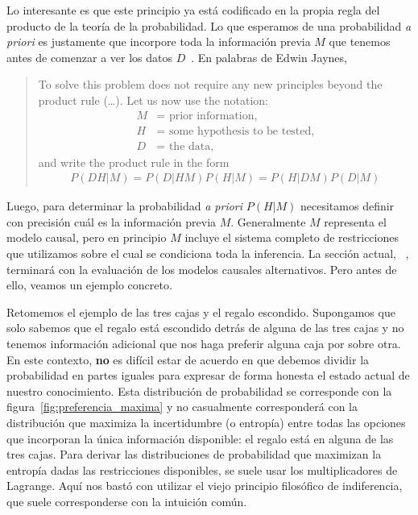 \documentclass[a4paper,11pt]{book}
\theoremstyle{definition}
\begin{document}
%
Lo interesante es que este principio ya est\'a codificado en la propia regla del producto de la teor\'ia de la probabilidad.
%
Lo que esperamos de una probabilidad \emph{a priori} es justamente que incorpore toda la informaci\'on previa $M$ que tenemos antes de comenzar a ver los datos $D$~\cite{Jaynes2003}.
%
En palabras de Edwin Jaynes,
%
\begin{quotation}
To solve this problem does not require any new principles beyond the product rule (\dots). Let us now use the notation:
\begin{align*}
M &= \text{ prior information,} \\
H &= \text{ some hypothesis to be tested,} \\
D &= \text{ the data,}
\end{align*}
and write the product rule in the form
\begin{align}
P(DH|M) = P(D|HM)P(H|M) = P(H|DM)P(D|M)
\end{align}
\end{quotation}
%
Luego, para determinar la probabilidad \emph{a priori} $P(H|M)$ necesitamos definir con precisi\'on cu\'al es la informaci\'on previa $M$.
%
Generalmente $M$ representa el modelo causal, pero en principio $M$ incluye el sistema completo de restricciones que utilizamos sobre el cual se condiciona toda la inferencia.
%
La secci\'on actual,~ \emph{}, terminar\'a con la evaluaci\'on de los modelos causales alternativos.
%
Pero antes de ello, veamos un ejemplo concreto.


Retomemos el ejemplo de las tres cajas y el regalo escondido.
Supongamos que solo sabemos que el regalo est\'a escondido detr\'as de alguna de las tres cajas y no tenemos informaci\'on adicional que nos haga preferir alguna caja por sobre otra.
%
En este contexto, \textbf{no} es dif\'icil estar de acuerdo en que debemos dividir la probabilidad en partes iguales para expresar de forma honesta el estado actual de nuestro conocimiento.
%
Esta distribuci\'on de probabilidad se corresponde con la figura~\ref{fig:preferencia_maxima} y no casualmente corresponder\'a con la distribuci\'on que maximiza la incertidumbre (o entrop\'ia) entre todas las opciones que incorporan la \'unica informaci\'on disponible: el regalo est\'a en alguna de las tres cajas.
%
Para derivar las distribuciones de probabilidad que maximizan la entrop\'ia dadas las restricciones disponibles, se suele usar los multiplicadores de Lagrange.
%
Aqu\'i nos bast\'o con utilizar el viejo principio filos\'ofico de indiferencia, que suele corresponderse con la intuici\'on com\'un.
\end{document}
